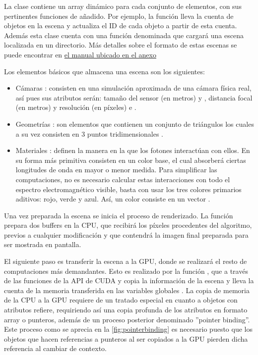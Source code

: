La clase  contiene un array dinámico para cada conjunto de elementos, con sus pertinentes funciones de añadido. Por ejemplo, la función  lleva la cuenta de objetos en la escena y actualiza el ID de cada objeto a partir de esta cuenta. Además esta clase cuenta con una función denominada  que cargará una escena localizada en un directorio. Más detalles sobre el formato de estas escenas se puede encontrar en \hyperref[sceneformat]{el manual ubicado en el anexo}

Los elementos básicos que almacena una escena son los siguientes:

\begin{itemize}

\item Cámaras : consisten en una simulación aproximada de una cámara física real, así pues sus atributos serán: tamaño del sensor (en metros)  y , distancia focal (en metros)  y resolución (en píxeles)  e . 

\item Geometrías : son elementos que contienen un conjunto de triángulos  los cuales a su vez consisten en 3 puntos tridimensionales .

\item Materiales : definen la manera en la que los fotones interactúan con ellos. En su forma más primitiva consisten en un color base, el cual absorberá ciertas longitudes de onda en mayor o menor medida. Para simplificar las computaciones, no es necesario calcular estas interacciones con todo el espectro electromagnético visible, basta con usar los tres colores primarios aditivos: rojo, verde y azul. Así, un color consiste en un vector .

\end{itemize}

Una vez preparada la escena se inicia el proceso de renderizado. La función  prepara dos buffers en la CPU,  que recibirá los píxeles procedentes del algoritmo, previos a cualquier modificación y  que contendrá la imagen final preparada para ser mostrada en pantalla. 


El siguiente paso es transferir la escena a la GPU, donde se realizará el resto de computaciones más demandantes. Esto es realizado por la función , que a través de las funciones de la API de CUDA  y  copia la información de la escena y lleva la cuenta de la memoria transferida en las variables globales . La copia de memoria de la CPU a la GPU requiere de un tratado especial en cuanto a objetos con atributos refiere, requiriendo así una copia profunda de los atributos en formato array o punteros, además de un proceso posterior denominado ''pointer binding''. Este proceso como se aprecia en la \autoref{fig:pointerbinding} es necesario puesto que los objetos que hacen referencias a punteros al ser copiados a la GPU pierden dicha referencia al cambiar de contexto. 

